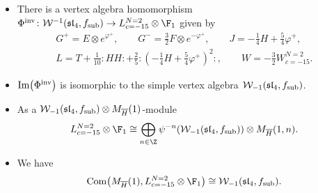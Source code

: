 \begin{Proposition} \label{ulaganje-2}
\quad
\begin{itemize}\itemsep=0pt
	\item[$(1)$] There is a vertex algebra homomorphism $\Phi^{\rm inv} \colon \mathcal{W}^{-1}(\mathfrak{sl}_4, f_{\rm sub}) \rightarrow L^{N=2}_{c=-15} \otimes \F_{1}$ given by
	\begin{gather*}
		G^+ = E\otimes e^{\varphi^+}, \qquad
		G^- = \frac{3}{2} F \otimes e^{-\varphi^+}, \qquad
		J = - \frac{1}{4} H + \frac{5}{4} \varphi^+, \\
		L = T + \frac{1} {10} {:}H H{:}+ \frac{2}{5} {:}\left( - \frac{1}{4} H + \frac{5}{4} \varphi^+\right)^2{:}, \qquad
		W = -\frac{3}{2} W^{N=2}_{c=-15}.
	\end{gather*}
	
\item[$(2)$] $\operatorname{Im} \bigl(\Phi^{\rm inv}\bigr) $ is isomorphic to the simple vertex algebra $ \mathcal{W}_{-1}(\mathfrak{sl}_4, f_{\rm sub})$.

\item[$(3)$]
 As a $ \mathcal{W}_{-1}(\mathfrak{sl}_4, f_{\rm sub})\otimes M_{\overline{H}} (1)$-module
\[
L^{N=2}_{c=-15} \otimes \F_{1} \cong \bigoplus_{n\in {\Z} }
 \psi^{-n} ( \mathcal{W}_{-1}(\mathfrak{sl}_4, f_{\rm sub})) \otimes M_{\overline{H}} (1, n).
 \]
 \item[$(4)$] We have
\[
 \operatorname{Com} \bigl(M_{\overline{H}}(1), L^{N=2}_{c=-15} \otimes \F_{1}\bigr) \cong \mathcal{W}_{-1}(\mathfrak{sl}_4, f_{\rm sub}).
 \]
 \end{itemize}
	
\end{Proposition}
